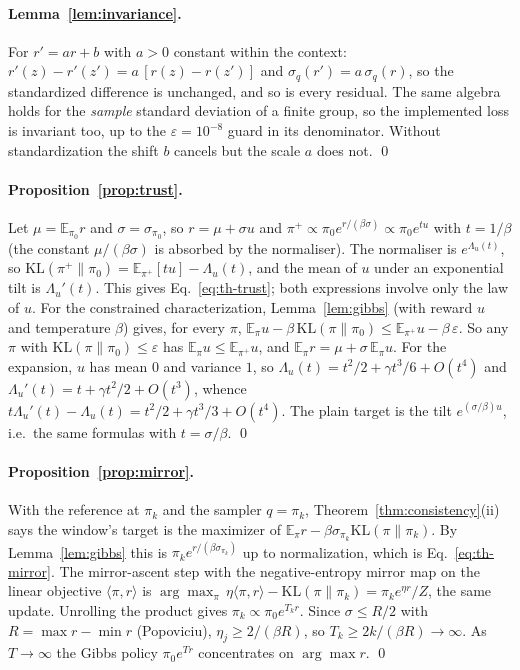 \paragraph{Lemma~\ref{lem:invariance}.}
For $r' = a r + b$ with $a > 0$ constant within the context:
$r'(z) - r'(z') = a\,[r(z) - r(z')]$ and $\sigma_q(r') = a\,\sigma_q(r)$, so the
standardized difference is unchanged, and so is every residual. The same
algebra holds for the \emph{sample} standard deviation of a finite group, so the
implemented loss is invariant too, up to the $\varepsilon = 10^{-8}$ guard in
its denominator. Without standardization the shift $b$ cancels but the scale
$a$ does not. \qed

\paragraph{Proposition~\ref{prop:trust}.}
Let $\mu = \mathbb{E}_{\pi_0}r$ and $\sigma = \sigma_{\pi_0}$, so $r = \mu + \sigma u$
and $\pi^+ \propto \pi_0 e^{r/(\beta\sigma)} \propto \pi_0 e^{t u}$ with $t = 1/\beta$
(the constant $\mu/(\beta\sigma)$ is absorbed by the normaliser). The
normaliser is $e^{\Lambda_u(t)}$, so
$\mathrm{KL}(\pi^+\|\pi_0) = \mathbb{E}_{\pi^+}[t u] - \Lambda_u(t)$, and the mean
of $u$ under an exponential tilt is $\Lambda_u'(t)$. This gives
Eq.~\eqref{eq:th-trust}; both expressions involve only the law of $u$.
For the constrained characterization, Lemma~\ref{lem:gibbs} (with reward $u$
and temperature $\beta$) gives, for every $\pi$,
$\mathbb{E}_\pi u - \beta\,\mathrm{KL}(\pi\|\pi_0) \le
\mathbb{E}_{\pi^+}u - \beta\,\varepsilon$. So any $\pi$ with
$\mathrm{KL}(\pi\|\pi_0) \le \varepsilon$ has $\mathbb{E}_\pi u \le
\mathbb{E}_{\pi^+}u$, and $\mathbb{E}_\pi r = \mu + \sigma\,\mathbb{E}_\pi u$.
For the expansion, $u$ has mean $0$ and variance $1$, so
$\Lambda_u(t) = t^2/2 + \gamma t^3/6 + O(t^4)$ and
$\Lambda_u'(t) = t + \gamma t^2/2 + O(t^3)$, whence
$t\Lambda_u'(t) - \Lambda_u(t) = t^2/2 + \gamma t^3/3 + O(t^4)$. The plain target
is the tilt $e^{(\sigma/\beta)u}$, i.e.\ the same formulas with
$t = \sigma/\beta$. \qed

\paragraph{Proposition~\ref{prop:mirror}.}
With the reference at $\pi_k$ and the sampler $q = \pi_k$,
Theorem~\ref{thm:consistency}(ii) says the window's target is the maximizer of
$\mathbb{E}_\pi r - \beta\sigma_{\pi_k}\mathrm{KL}(\pi\|\pi_k)$. By
Lemma~\ref{lem:gibbs} this is $\pi_k e^{r/(\beta\sigma_{\pi_k})}$ up to
normalization, which is Eq.~\eqref{eq:th-mirror}. The mirror-ascent step with
the negative-entropy mirror map on the linear objective
$\langle\pi, r\rangle$ is $\arg\max_\pi\, \eta\langle\pi,r\rangle -
\mathrm{KL}(\pi\|\pi_k) = \pi_k e^{\eta r}/Z$, the same update. Unrolling the
product gives $\pi_k \propto \pi_0 e^{T_k r}$. Since $\sigma \le R/2$ with
$R = \max r - \min r$ (Popoviciu), $\eta_j \ge 2/(\beta R)$, so
$T_k \ge 2k/(\beta R) \to \infty$. As $T\to\infty$ the Gibbs policy
$\pi_0 e^{Tr}$ concentrates on $\arg\max r$. \qed

